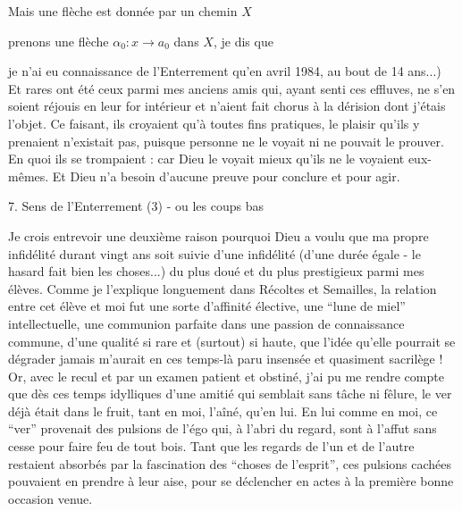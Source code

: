 Mais une  flèche  est donnée par un chemin  $X$


 prenons une flèche $\alpha_0:x\longrightarrow a_0$ dans $X$, je dis que 


je n'ai eu connaissance de l'Enterrement qu'en avril 1984, au bout de 14 ans...) Et rares ont été ceux parmi mes anciens amis qui, ayant senti ces effluves, ne s'en soient réjouis en leur for intérieur et n'aient fait chorus à la dérision dont j'étais l'objet. Ce faisant, ils croyaient qu'à toutes fins pratiques, le plaisir qu'ils y prenaient n'existait pas, puisque personne ne le voyait ni ne pouvait le prouver. En quoi ils se trompaient : car Dieu le voyait mieux qu'ils ne le voyaient eux-mêmes. Et Dieu n'a besoin d'aucune preuve pour conclure et pour agir.

7. Sens de l'Enterrement (3) - ou les coups bas

Je crois entrevoir une deuxième raison pourquoi Dieu a voulu que ma propre infidélité durant vingt ans soit suivie d'une infidélité (d'une durée égale - le hasard fait bien les choses...) du plus doué et du plus prestigieux parmi mes élèves. Comme je l'explique longuement dans Récoltes et Semailles, la relation entre cet élève et moi fut une sorte d'affinité élective, une ``lune de miel'' intellectuelle, une communion parfaite dans une passion de connaissance commune, d'une qualité si rare et (surtout) si haute, que l'idée qu'elle pourrait se dégrader jamais m'aurait en ces temps-là paru insensée et quasiment sacrilège ! Or, avec le recul et par un examen patient et obstiné, j'ai pu me rendre compte que dès ces temps idylliques d'une amitié qui semblait sans tâche ni fêlure, le ver déjà était dans le fruit, tant en moi, l'aîné, qu'en lui. En lui comme en moi, ce ``ver'' provenait des pulsions de l'égo qui, à l'abri du regard, sont à l'affut sans cesse pour faire feu de tout bois. Tant que les regards de l'un et de l'autre restaient absorbés par la fascination des ``choses de l'esprit'', ces pulsions cachées pouvaient en prendre à leur aise, pour se déclencher en actes à la première bonne occasion venue.

